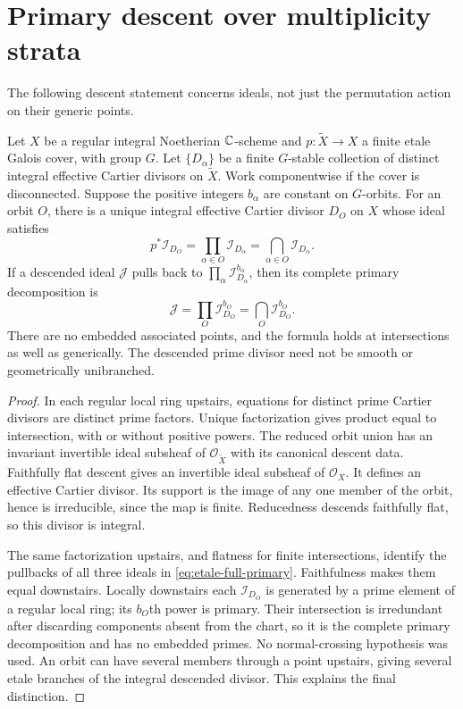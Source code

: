 \section{Primary descent over multiplicity strata}
\label{sec:primary-descent}
The following descent statement concerns ideals, not just the
permutation action on their generic points.

\begin{lemma}
\label{lem:etale-primary-descent}
Let $X$ be a regular integral Noetherian $\mathbb C$-scheme and
$p:\widetilde X\to X$ a finite etale Galois cover, with group $G$.
Let $\{D_\alpha\}$ be a finite $G$-stable collection of distinct
integral effective Cartier divisors on $\widetilde X$. Work
componentwise if the cover is disconnected. Suppose the positive
integers $b_\alpha$ are constant on $G$-orbits. For an orbit $O$,
there is a unique integral effective Cartier divisor $D_O$ on $X$
whose ideal satisfies
\[
 p^*\mathcal I_{D_O}=\prod_{\alpha\in O}\mathcal I_{D_\alpha}
                      =\bigcap_{\alpha\in O}\mathcal I_{D_\alpha}.
\]
If a descended ideal $\mathcal J$ pulls back to
$\prod_\alpha\mathcal I_{D_\alpha}^{b_\alpha}$, then its complete
primary decomposition is
\begin{equation}\label{eq:etale-full-primary}
 \mathcal J=\prod_O\mathcal I_{D_O}^{b_O}
            =\bigcap_O\mathcal I_{D_O}^{b_O}.
\end{equation}
There are no embedded associated points, and the formula holds at
intersections as well as generically. The descended prime divisor
need not be smooth or geometrically unibranched.
\end{lemma}
\begin{proof}
In each regular local ring upstairs, equations for distinct prime
Cartier divisors are distinct prime factors. Unique factorization
gives product equal to intersection, with or without positive
powers. The reduced orbit union has an invariant invertible ideal
subsheaf of $\mathcal O_{\widetilde X}$ with its canonical descent
data. Faithfully flat descent gives an invertible ideal subsheaf
of $\mathcal O_X$. It defines an effective Cartier divisor. Its
support is the image of any one member of the orbit, hence is
irreducible, since the map is finite. Reducedness descends
faithfully flat, so this divisor is integral.

The same factorization upstairs, and flatness for finite
intersections, identify the pullbacks of all three ideals in
\eqref{eq:etale-full-primary}. Faithfulness makes them equal
downstairs. Locally downstairs each $\mathcal I_{D_O}$ is generated
by a prime element of a regular local ring; its $b_O$th power is
primary. Their intersection is irredundant after discarding
components absent from the chart, so it is the complete primary
decomposition and has no embedded primes. No normal-crossing
hypothesis was used. An orbit can have several members through a
point upstairs, giving several etale branches of the integral
descended divisor. This explains the final distinction.
\end{proof}

